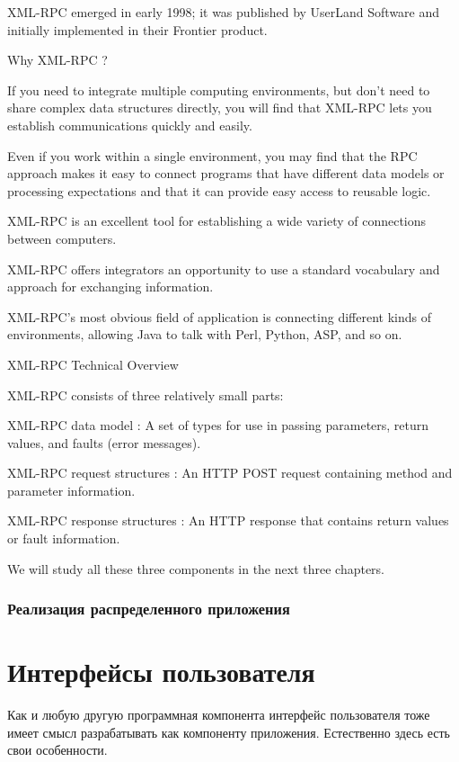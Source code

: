 \documentclass[a4paper,openany,twoside,draft]{book}
\begin{document}
    XML-RPC emerged in early 1998; it was published by UserLand Software and initially implemented in their Frontier product.

Why XML-RPC ?

If you need to integrate multiple computing environments, but don't need to share complex data structures directly, you will find that XML-RPC lets you establish communications quickly and easily.

Even if you work within a single environment, you may find that the RPC approach makes it easy to connect programs that have different data models or processing expectations and that it can provide easy access to reusable logic.

    XML-RPC is an excellent tool for establishing a wide variety of connections between computers.

    XML-RPC offers integrators an opportunity to use a standard vocabulary and approach for exchanging information.

    XML-RPC's most obvious field of application is connecting different kinds of environments, allowing Java to talk with Perl, Python, ASP, and so on.

XML-RPC Technical Overview

XML-RPC consists of three relatively small parts:

    XML-RPC data model : A set of types for use in passing parameters, return values, and faults (error messages).

    XML-RPC request structures : An HTTP POST request containing method and parameter information.

    XML-RPC response structures : An HTTP response that contains return values or fault information.

We will study all these three components in the next three chapters.

\newpage
\subsection{Реализация распределенного приложения}
\label{sec:distrimpl}



\chapter{Интерфейсы пользователя}

Как и любую другую программная компонента интерфейс пользователя тоже имеет смысл разрабатывать как компоненту приложения.  Естественно здесь есть свои особенности.
\end{document}
